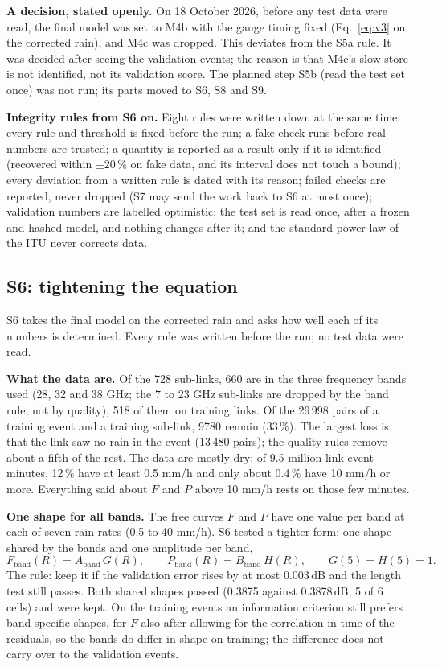 \documentclass[11pt,a4paper]{article}
\newcommand{\dB}{\,\mathrm{dB}}
\begin{document}
\textbf{A decision, stated openly.} On 18 October 2026, before any test data were read, the final model was set to
M4b with the gauge timing fixed (Eq.~\eqref{eq:v3} on the corrected rain), and M4c was dropped. This deviates from the
S5a rule. It was decided after seeing the validation events; the reason is that M4c's slow store is not identified,
not its validation score. The planned step S5b (read the test set once) was not run; its parts moved to S6, S8 and S9.

\textbf{Integrity rules from S6 on.} Eight rules were written down at the same time: every rule and threshold is fixed
before the run; a fake check runs before real numbers are trusted; a quantity is reported as a result only if it is
identified (recovered within $\pm 20\,\%$ on fake data, and its interval does not touch a bound); every deviation from
a written rule is dated with its reason; failed checks are reported, never dropped (S7 may send the work back to S6 at
most once); validation numbers are labelled optimistic; the test set is read once, after a frozen and hashed model,
and nothing changes after it; and the standard power law of the ITU never corrects data.

\subsection{S6: tightening the equation}
\label{sec:s6}

S6 takes the final model on the corrected rain and asks how well each of its numbers is determined. Every rule was
written before the run; no test data were read.

\textbf{What the data are.} Of the 728 sub-links, 660 are in the three frequency bands used (28, 32 and 38 GHz; the
7 to 23 GHz sub-links are dropped by the band rule, not by quality), 518 of them on training links. Of the 29\,998
pairs of a training event and a training sub-link, 9780 remain (33\,\%). The largest loss is that the link saw no
rain in the event (13\,480 pairs); the quality rules remove about a fifth of the rest. The data are mostly dry: of
9.5 million link-event minutes, 12\,\% have at least 0.5 mm/h and only about 0.4\,\% have 10 mm/h or more. Everything
said about $F$ and $P$ above 10 mm/h rests on those few minutes.

\textbf{One shape for all bands.} The free curves $F$ and $P$ have one value per band at each of seven rain rates
(0.5 to 40 mm/h). S6 tested a tighter form: one shape shared by the bands and one amplitude per band,
\begin{equation}
F_{\mathrm{band}}(R) = A_{\mathrm{band}}\,G(R), \qquad P_{\mathrm{band}}(R) = B_{\mathrm{band}}\,H(R), \qquad
G(5) = H(5) = 1 .
\label{eq:shared}
\end{equation}
The rule: keep it if the validation error rises by at most 0.003$\dB$ and the length test still passes. Both shared
shapes passed (0.3875 against 0.3878$\dB$, 5 of 6 cells) and were kept. On the training events an information
criterion still prefers band-specific shapes, for $F$ also after allowing for the correlation in time of the
residuals, so the bands do differ in shape on training; the difference does not carry over to the validation events.
\end{document}
